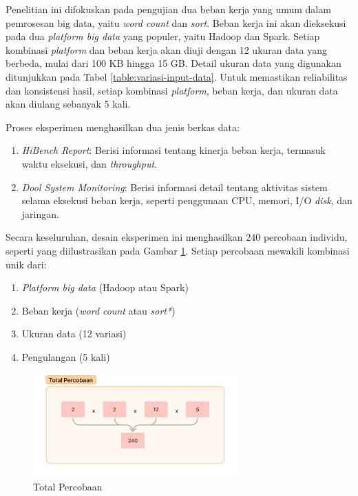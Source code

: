 Penelitian ini difokuskan pada pengujian dua beban kerja yang umum dalam pemrosesan big data, yaitu \textit{word count} dan \textit{sort}. Beban kerja ini akan dieksekusi pada dua \textit{platform big data} yang populer, yaitu Hadoop dan Spark. Setiap kombinasi \textit{platform} dan beban kerja akan diuji dengan 12 ukuran data yang berbeda, mulai dari 100 KB hingga 15 GB. Detail ukuran data yang digunakan ditunjukkan pada Tabel \ref{table:variasi-input-data}. Untuk memastikan reliabilitas dan konsistensi hasil, setiap kombinasi \textit{platform}, beban kerja, dan ukuran data akan diulang sebanyak 5 kali. 

Proses eksperimen menghasilkan dua jenis berkas data: 
\begin{enumerate}
	\item \textit{HiBench Report}: Berisi informasi tentang kinerja beban kerja, termasuk waktu eksekusi, dan \textit{throughput}.
	\item \textit{Dool System Monitoring}: Berisi informasi detail tentang aktivitas sistem selama eksekusi beban kerja, seperti penggunaan CPU, memori, I/O \textit{disk}, dan jaringan.
\end{enumerate}

Secara keseluruhan, desain eksperimen ini menghasilkan 240 percobaan individu, seperti yang diilustrasikan pada Gambar \ref{fig:total-percobaan}. Setiap percobaan mewakili kombinasi unik dari:
\begin{enumerate}
	\item \textit{Platform big data} (Hadoop atau Spark)
	\item Beban kerja (\textit{word count} atau \textit{sort*})
	\item Ukuran data (12 variasi)
	\item Pengulangan (5 kali)
\end{enumerate}

\begin{figure}[h]
    \centering
    \includegraphics[width=0.7\textwidth]{figures/ch03/total-percobaan.png}
    \caption{Total Percobaan}
    \label{fig:total-percobaan}
\end{figure}

